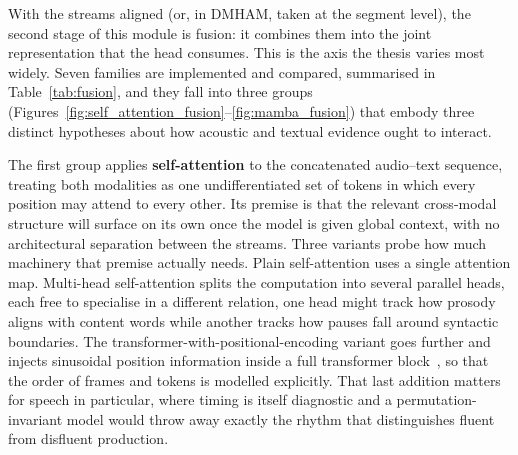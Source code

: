 \documentclass[a4paper,12pt]{article}
\begin{document}
With the streams aligned (or, in DMHAM, taken at the segment level), the second stage of this module is fusion: it combines them into the joint representation that the head consumes. This is the axis the thesis varies most widely. Seven families are implemented and compared, summarised in Table~\ref{tab:fusion}, and they fall into three groups (Figures~\ref{fig:self_attention_fusion}--\ref{fig:mamba_fusion}) that embody three distinct hypotheses about how acoustic and textual evidence ought to interact.

The first group applies \textbf{self-attention} to the concatenated audio--text sequence, treating both modalities as one undifferentiated set of tokens in which every position may attend to every other. Its premise is that the relevant cross-modal structure will surface on its own once the model is given global context, with no architectural separation between the streams. Three variants probe how much machinery that premise actually needs. Plain self-attention uses a single attention map. Multi-head self-attention splits the computation into several parallel heads, each free to specialise in a different relation, one head might track how prosody aligns with content words while another tracks how pauses fall around syntactic boundaries. The transformer-with-positional-encoding variant goes further and injects sinusoidal position information inside a full transformer block~\cite{vaswani2017attention}, so that the order of frames and tokens is modelled explicitly. That last addition matters for speech in particular, where timing is itself diagnostic and a permutation-invariant model would throw away exactly the rhythm that distinguishes fluent from disfluent production.
\end{document}
